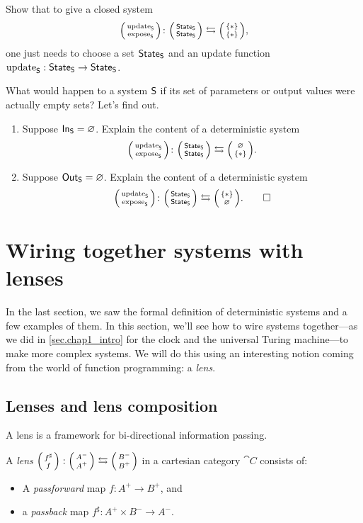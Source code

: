 \documentclass[DynamicalBook]{subfiles}
\begin{document}
\begin{exercise}
Show that to give a closed system
\[\lens{\update{S}}{\expose{S}}\colon\lens{\State{S}}{\State{S}}\fromto\lens{\{*\}}{\{*\}},\]
one just needs to choose a set $\mathsf{State}_{\mathsf{S}}$ and an update function $\mathrm{update}_{\mathsf{S}} :  \mathsf{State}_{\mathsf{S}} \to \mathsf{State}_{\mathsf{S}}$.
\end{exercise}

\begin{exercise}
What would happen to a system $\mathsf{S}$ if its set of parameters or output values were actually empty sets? Let's find out.
\begin{enumerate}
	\item Suppose $\mathsf{In}_{\mathsf{S}}=\varnothing$. Explain the content of a deterministic system \[\lens{\update{S}}{\expose{S}}\colon\lens{\State{S}}{\State{S}}\fromto\lens{\varnothing}{\{*\}}.\]
	\item Suppose $\mathsf{Out}_{\mathsf{S}}=\varnothing$. Explain the content of a deterministic system \[\lens{\update{S}}{\expose{S}}\colon\lens{\State{S}}{\State{S}}\fromto\lens{\{*\}}{\varnothing}.
	\qedhere
\]	
\end{enumerate}
\end{exercise}


\section{Wiring together systems with lenses}\label{sec.wiring_discrete_systems}

In the last section, we saw the formal definition of deterministic systems and a
few examples of them. In this section, we'll see how to wire systems together---as we did in \cref{sec.chap1_intro} for the clock and the universal Turing machine---to
make more complex systems. We will do this using an interesting notion coming
from the world of function programming: a \emph{lens}.

\subsection{Lenses and lens composition}\label{sec.lens_discrete}

A lens is a framework for bi-directional information passing.

\begin{definition}\label{def.lens}
  A \emph{lens} $\lens{f^{\sharp}}{f} : \lens{A^-}{A^+} \leftrightarrows
  \lens{B^-}{B^+}$ in a cartesian category $\cat{C}$ consists of:
  \begin{itemize}
  \item A \emph{passforward} map $f : A^+ \to B^+$, and
    \item a \emph{passback} map $f^{\sharp} : A^+ \times B^- \to A^-$.
  \end{itemize}
\end{definition}
\end{document}
